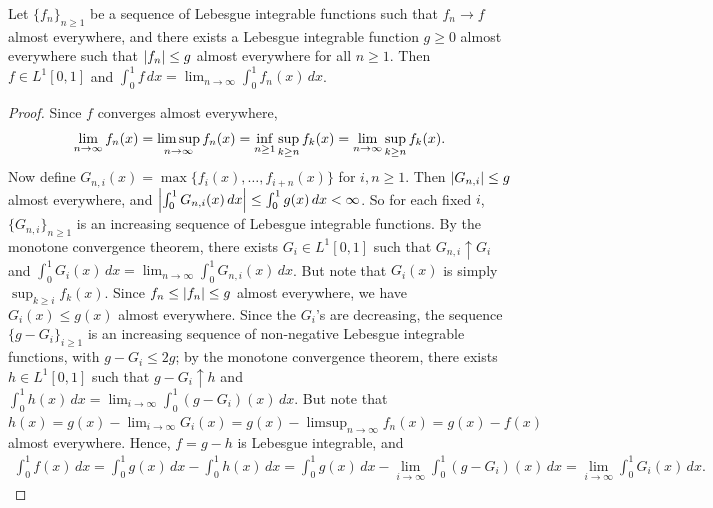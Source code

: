 \begin{theorem}
    Let $\{f_{n}\}_{n \geq 1}$ be a sequence of Lebesgue integrable functions such that $f_{n} \to f$ almost everywhere, and there exists a Lebesgue integrable function $g \geq 0$ almost everywhere such that $\left| f_{n} \right| \leq g$ almost everywhere for all $n \geq 1$. Then $f \in L^{1}[0,1]$ and $\int_{0}^{1} f \, dx = \lim_{n \to \infty} \int_{0}^{1} f_{n}(x) \, dx$.
\end{theorem}
\begin{proof}
    Since $f$ converges almost everywhere,
    \begin{align}
        \lim_{n \to \infty} f_{n}(x) = \limsup_{n \to \infty} f_{n}(x) = \inf_{n \geq 1} \sup_{k \geq n} f_{k}(x) = \lim_{n \to \infty} \sup_{k \geq n} f_{k}(x).
    \end{align}
    Now define $G_{n,i}(x) = \max\{f_{i}(x),\ldots,f_{i+n}(x)\}$ for $i,n \geq 1$. Then $\left| G_{n,i} \right| \leq g$ almost everywhere, and $\left| \int_{0}^{1} G_{n,i}(x) \, dx \right| \leq \int_{0}^{1} g(x) \, dx < \infty$. So for each fixed $i$, $\{G_{n,i}\}_{n \geq 1}$ is an increasing sequence of Lebesgue integrable functions. By the monotone convergence theorem, there exists $G_{i} \in L^{1}[0,1]$ such that $G_{n,i} \uparrow G_{i}$ and $\int_{0}^{1} G_{i}(x) \, dx = \lim_{n \to \infty} \int_{0}^{1} G_{n,i}(x) \, dx$. But note that $G_{i}(x)$ is simply $\sup_{k \geq i} f_{k}(x)$. Since $f_{n} \leq \left| f_{n} \right| \leq g$ almost everywhere, we have $G_{i}(x) \leq g(x)$ almost everywhere. Since the $G_{i}$'s are decreasing, the sequence $\{g-G_{i}\}_{i \geq 1}$ is an increasing sequence of non-negative Lebesgue integrable functions, with $g-G_{i} \leq 2g$; by the monotone convergence theorem, there exists $h \in L^{1}[0,1]$ such that $g-G_{i} \uparrow h$ and $\int_{0}^{1} h(x) \, dx = \lim_{i \to \infty} \int_{0}^{1} (g-G_{i})(x) \, dx$. But note that $h(x) = g(x)-\lim_{i \to \infty} G_{i}(x) = g(x)-\limsup_{n \to \infty} f_{n}(x) = g(x)-f(x)$ almost everywhere. Hence, $f = g-h$ is Lebesgue integrable, and
    \begin{align}
        \int_{0}^{1} f(x) \, dx = \int_{0}^{1} g(x) \, dx - \int_{0}^{1} h(x) \, dx = \int_{0}^{1} g(x) \, dx - \lim_{i \to \infty} \int_{0}^{1} (g-G_{i})(x) \, dx = \lim_{i \to \infty} \int_{0}^{1} G_{i}(x) \, dx.
    \end{align}
\end{proof}

